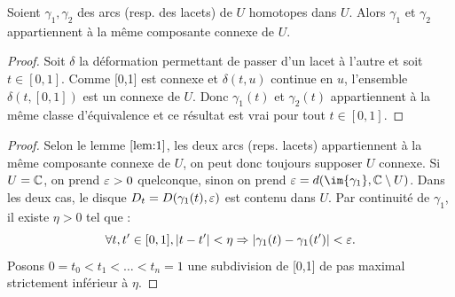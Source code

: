 \begin{lem}
\label{lem:1}
Soient $\gamma_1, \gamma_2$ des arcs (resp. des lacets) de $U$ homotopes dans $U$.
Alors $\gamma_1$ et $\gamma_2$ appartiennent à la même composante connexe de $U$.
\end{lem}

\begin{proof}
Soit $\delta$ la déformation permettant de passer d'un lacet à l'autre et soit $t \in [0,1]$.
Comme [0,1] est connexe et $\delta(t,u)$ continue en $u$, l'ensemble $\delta(t, [0,1])$ est un connexe de $U$.
Donc $\gamma_1(t)$ et $\gamma_2(t)$ appartiennent à la même classe d'équivalence et ce résultat est vrai pour tout $t \in [0,1]$.
\end{proof}


\begin{proof}
Selon le lemme $\ref{lem:1}$, les deux arcs (reps. lacets) appartiennent à la même composante connexe de $U$, 
on peut donc toujours supposer $U$ connexe.
Si $U = \mathbb{C}$, on prend $\varepsilon >0$ quelconque, sinon on prend $\veps = d(\im{\gamma_1}, \Cx \setminus U)$.
Dans les deux cas, le disque $D_t = D(\gamma_1(t), \varepsilon)$ est contenu dans $U$.
Par continuité de $\gamma_1$, il existe $\eta > 0$ tel que :
\[ \forall t, t' \in [0,1], \lvert t-t'\rvert < \eta \Rightarrow \lvert\gamma_1(t) - \gamma_1(t')\rvert < \varepsilon . \]
Posons $0=t_0 < t_1 < \dots < t_n = 1$ une subdivision de [0,1] de pas maximal strictement inférieur à $\eta$.

\end{proof}

